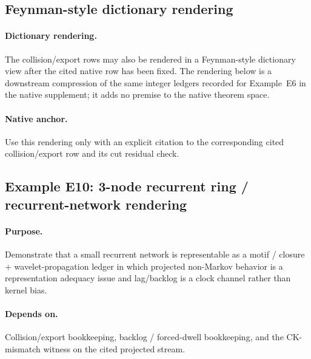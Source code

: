 \subsection{Feynman-style dictionary rendering}\label{app:feynman-dict}
\paragraph{Dictionary rendering.} The collision/export rows may also be rendered in a Feynman-style dictionary view after the cited native row has been fixed. The rendering below is a downstream compression of the same integer ledgers recorded for Example~E6 in the native supplement; it adds no premise to the native theorem space.

\begin{center}
\end{center}

\paragraph{Native anchor.} Use this rendering only with an explicit citation to the corresponding cited collision/export row and its cut residual check.


\subsection{Example E10: 3-node recurrent ring / recurrent-network rendering}\label{app:e10-neural}
\paragraph{Purpose.} Demonstrate that a small recurrent network is representable as a motif / closure + wavelet-propagation ledger in which projected non-Markov behavior is a representation adequacy issue and lag/backlog is a clock channel rather than kernel bias.
\paragraph{Depends on.} Collision/export bookkeeping, backlog / forced-dwell bookkeeping, and the CK-mismatch witness on the cited projected stream.
